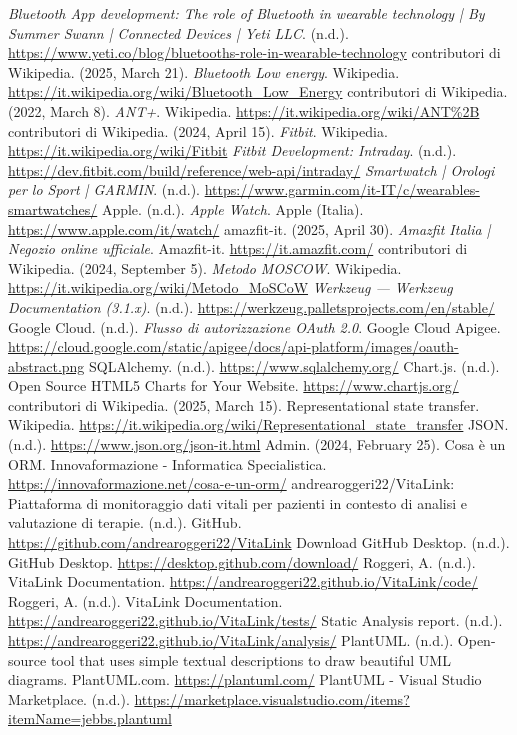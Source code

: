 \documentclass[12pt,a4paper,oneside]{report}
\begin{document}
\begin{thebibliography}{99}
     \textit{Bluetooth App development: The role of Bluetooth in wearable technology | By Summer Swann | Connected Devices | Yeti LLC}. (n.d.). \url{https://www.yeti.co/blog/bluetooths-role-in-wearable-technology}
     contributori di Wikipedia. (2025, March 21). \textit{Bluetooth Low energy}. Wikipedia. \url{https://it.wikipedia.org/wiki/Bluetooth_Low_Energy}
     contributori di Wikipedia. (2022, March 8). \textit{ANT+}. Wikipedia. \url{https://it.wikipedia.org/wiki/ANT%2B}
     contributori di Wikipedia. (2024, April 15). \textit{Fitbit}. Wikipedia. \url{https://it.wikipedia.org/wiki/Fitbit}
     \textit{Fitbit Development: Intraday}. (n.d.). \url{https://dev.fitbit.com/build/reference/web-api/intraday/}
     \textit{Smartwatch | Orologi per lo Sport | GARMIN}. (n.d.). \url{https://www.garmin.com/it-IT/c/wearables-smartwatches/}
     Apple. (n.d.). \textit{Apple Watch}. Apple (Italia). \url{https://www.apple.com/it/watch/}
     amazfit-it. (2025, April 30). \textit{Amazfit Italia | Negozio online ufficiale}. Amazfit-it. \url{https://it.amazfit.com/}
     contributori di Wikipedia. (2024, September 5). \textit{Metodo MOSCOW}. Wikipedia. \url{https://it.wikipedia.org/wiki/Metodo_MoSCoW}
     \textit{Werkzeug — Werkzeug Documentation (3.1.x)}. (n.d.). \url{https://werkzeug.palletsprojects.com/en/stable/}
     Google Cloud. (n.d.). \textit{Flusso di autorizzazione OAuth 2.0}. Google Cloud Apigee. \url{https://cloud.google.com/static/apigee/docs/api-platform/images/oauth-abstract.png}
     SQLAlchemy. (n.d.). \url{https://www.sqlalchemy.org/}
     Chart.js. (n.d.). Open Source HTML5 Charts for Your Website. \url{https://www.chartjs.org/}
     contributori di Wikipedia. (2025, March 15). Representational state transfer. Wikipedia. \url{https://it.wikipedia.org/wiki/Representational_state_transfer}
     JSON. (n.d.). \url{https://www.json.org/json-it.html}
     Admin. (2024, February 25). Cosa è un ORM. Innovaformazione - Informatica Specialistica. \url{https://innovaformazione.net/cosa-e-un-orm/}
     andrearoggeri22/VitaLink: Piattaforma di monitoraggio dati vitali per pazienti in contesto di analisi e valutazione di terapie. (n.d.). GitHub. \url{https://github.com/andrearoggeri22/VitaLink}
     Download GitHub Desktop. (n.d.). GitHub Desktop. \url{https://desktop.github.com/download/}
     Roggeri, A. (n.d.). VitaLink Documentation. \url{https://andrearoggeri22.github.io/VitaLink/code/}
     Roggeri, A. (n.d.). VitaLink Documentation. \url{https://andrearoggeri22.github.io/VitaLink/tests/}
     Static Analysis report. (n.d.). \url{https://andrearoggeri22.github.io/VitaLink/analysis/}
     PlantUML. (n.d.). Open-source tool that uses simple textual descriptions to draw beautiful UML diagrams. PlantUML.com. \url{https://plantuml.com/}
     PlantUML - Visual Studio Marketplace. (n.d.). \url{https://marketplace.visualstudio.com/items?itemName=jebbs.plantuml}
\end{thebibliography}
\end{document}
